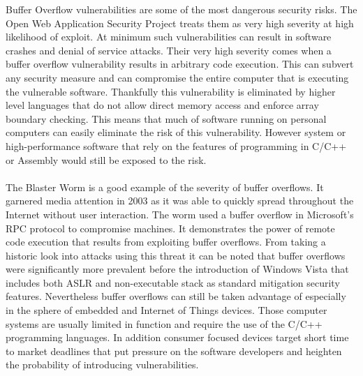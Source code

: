 Buffer Overflow vulnerabilities are some of the most dangerous security risks. The Open Web Application Security Project \cite{owasp} treats them as very high severity at high likelihood of exploit. At minimum such vulnerabilities can result in software crashes and denial of service attacks. Their very high severity comes when a buffer overflow vulnerability results in arbitrary code execution. This can subvert any security measure and can compromise the entire computer that is executing the vulnerable software. Thankfully this vulnerability is eliminated by higher level languages that do not allow direct memory access and enforce array boundary checking. This means that much of software running on personal computers can easily eliminate the risk of this vulnerability. However system or high-performance software that rely on the features of programming in C/C++ or Assembly would still be exposed to the risk. \\ \\
The Blaster Worm\cite{balster_cert} is a good example of the severity of buffer overflows. It garnered media attention in 2003 as it was able to quickly spread throughout the Internet without user interaction. The worm used a buffer overflow in Microsoft's RPC protocol to compromise machines. It demonstrates the power of remote code execution that results from exploiting buffer overflows. From taking a historic look into attacks using this threat it can be noted that buffer overflows were significantly more prevalent before the introduction of Windows Vista that includes both ASLR and non-executable stack as standard mitigation security features. Nevertheless buffer overflows can still be taken advantage of especially in the sphere of embedded and Internet of Things devices. Those computer systems are usually limited in function and require the use of the C/C++ programming languages. In addition consumer focused devices target short time to market deadlines that put pressure on the software developers and heighten the probability of introducing vulnerabilities. \\ \\

